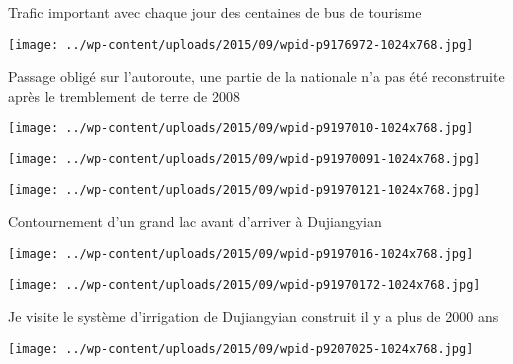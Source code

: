  

 Trafic important avec chaque jour des centaines de bus de tourisme 

 

\begin{center} \texttt{[image: ../wp-content/uploads/2015/09/wpid-p9176972-1024x768.jpg]} \end{center}

 

 Passage obligé sur l'autoroute, une partie de la nationale n'a pas été reconstruite après le tremblement de terre de 2008 

 

\begin{center} \texttt{[image: ../wp-content/uploads/2015/09/wpid-p9197010-1024x768.jpg]} \end{center}

 

 

\begin{center} \texttt{[image: ../wp-content/uploads/2015/09/wpid-p91970091-1024x768.jpg]} \end{center}

 

 

\begin{center} \texttt{[image: ../wp-content/uploads/2015/09/wpid-p91970121-1024x768.jpg]} \end{center}

 

 Contournement d'un grand lac avant d'arriver à Dujiangyian 

 

\begin{center} \texttt{[image: ../wp-content/uploads/2015/09/wpid-p9197016-1024x768.jpg]} \end{center}

 

 

\begin{center} \texttt{[image: ../wp-content/uploads/2015/09/wpid-p91970172-1024x768.jpg]} \end{center}

 

 Je visite le système d'irrigation de Dujiangyian construit il y a plus de 2000 ans 

 

\begin{center} \texttt{[image: ../wp-content/uploads/2015/09/wpid-p9207025-1024x768.jpg]} \end{center}

